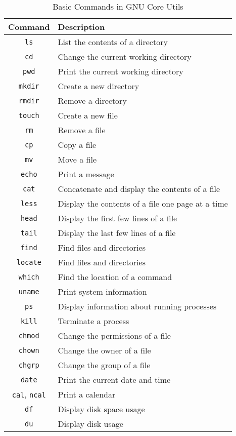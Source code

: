 \begin{table}[h!]
\caption{Basic Commands in GNU Core Utils}
\begin{tabular}{ c l }
  \toprule
 Command & Description \\
 \midrule
  \texttt{ls} & List the contents of a directory \\
  \texttt{cd} & Change the current working directory \\
  \texttt{pwd} & Print the current working directory \\
  \texttt{mkdir} & Create a new directory \\
  \texttt{rmdir} & Remove a directory \\
  \texttt{touch} & Create a new file \\
  \texttt{rm} & Remove a file \\
  \texttt{cp} & Copy a file \\
  \texttt{mv} & Move a file \\
  \texttt{echo} & Print a message \\
  \texttt{cat} & Concatenate and display the contents of a file \\
  \texttt{less} & Display the contents of a file one page at a time \\
  \texttt{head} & Display the first few lines of a file \\
  \texttt{tail} & Display the last few lines of a file \\
  \texttt{find} & Find files and directories \\
  \texttt{locate} & Find files and directories \\
  \texttt{which} & Find the location of a command \\
  \texttt{uname} & Print system information \\
  \texttt{ps} & Display information about running processes \\
  \texttt{kill} & Terminate a process \\
  \texttt{chmod} & Change the permissions of a file \\
  \texttt{chown} & Change the owner of a file \\
  \texttt{chgrp} & Change the group of a file \\
  \texttt{date} & Print the current date and time \\
  \texttt{cal}, \texttt{ncal} & Print a calendar \\
  \texttt{df} & Display disk space usage \\
  \texttt{du} & Display disk usage \\

\end{tabular}
\end{table}
